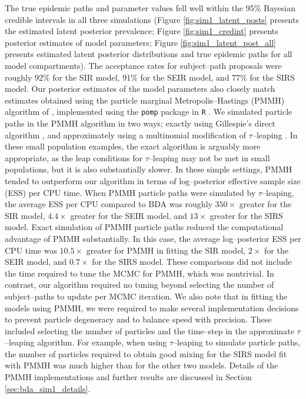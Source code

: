The true epidemic paths and parameter values fell well within the 95\% Bayesian credible intervals in all three simulations (Figure \ref{fig:sim1_latent_posts} presents the estimated latent posterior prevalence; Figure \ref{fig:sim1_credint} presents posterior estimates of model parameters; Figure \ref{fig:sim1_latent_post_all} presents estimated latent posterior distributions and true epidemic paths for all model compartments). The acceptance rates for subject--path proposals were roughly 92\% for the SIR model, 91\% for the SEIR model, and 77\% for the SIRS model. Our posterior estimates of the model parameters also closely match estimates obtained using the particle marginal Metropolis--Hastings (PMMH) algorithm of \cite{andrieu2010particle}, implemented using the \texttt{pomp} package in \texttt{R} \cite{pomp}. We simulated particle paths in the PMMH algorithm in two ways; exactly using Gillespie's direct algorithm \cite{gillespie1976general}, and approximately using a multinomial modification of $ \tau $--leaping \cite{breto2011compound}. In these small population examples, the exact algorithm is arguably more appropriate, as the leap conditions for $ \tau $--leaping may not be met in small populations, but it is also substantially slower. In these simple settings, PMMH tended to outperform our algorithm in terms of log--posterior effective sample size (ESS) per CPU time. When PMMH particle paths were simulated by $ \tau $--leaping, the average ESS per CPU compared to BDA was roughly $ 350\times $ greater for the SIR model, $ 4.4\times $ greater for the SEIR model, and $ 13\times $ greater for the SIRS model. Exact simulation of PMMH particle paths reduced the computational advantage of PMMH substantially. In this case, the average log--posterior ESS per CPU time was $ 10.5\times $ greater for PMMH in fitting the SIR model, $ 2\times $ for the SEIR model, and $ 0.7\times $ for the SIRS model. These comparisons did not include the time required to tune the MCMC for PMMH, which was nontrivial. In contrast, our algorithm required no tuning beyond selecting the number of subject--paths to update per MCMC iteration. We also note that in fitting the models using PMMH, we were required to make several implementation decisions to prevent particle degeneracy and to balance speed with precision. These included selecting the number of particles and the time--step in the approximate $ \tau $--leaping algorithm. For example, when using $ \tau $--leaping to simulate particle paths, the number of particles required to obtain good mixing for the SIRS model fit with PMMH was much higher than for the other two models. Details of the PMMH implementations and further results are discussed in Section \ref{sec:bda_sim1_details}.

